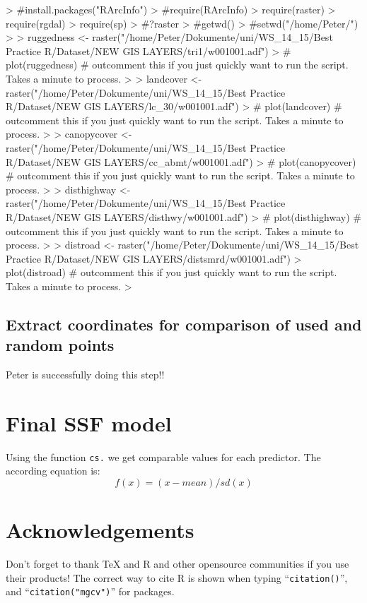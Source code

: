 \documentclass[11pt, a4paper]{article} %
\begin{document}
\begin{Schunk}
\begin{Sinput}
> #install.packages("RArcInfo")
> #require(RArcInfo)
> require(raster)
> require(rgdal)
> require(sp)
> #?raster
> #getwd()
> #setwd("/home/Peter/")
> 
> ruggedness <- raster("/home/Peter/Dokumente/uni/WS_14_15/Best Practice R/Dataset/NEW GIS LAYERS/tri1/w001001.adf") 
> # plot(ruggedness) # outcomment this if you just quickly want to run the script. Takes a minute to process.
> 
> landcover <- raster("/home/Peter/Dokumente/uni/WS_14_15/Best Practice R/Dataset/NEW GIS LAYERS/lc_30/w001001.adf") 
> # plot(landcover) # outcomment this if you just quickly want to run the script. Takes a minute to process.
> 
> canopycover <- raster("/home/Peter/Dokumente/uni/WS_14_15/Best Practice R/Dataset/NEW GIS LAYERS/cc_abmt/w001001.adf") 
> # plot(canopycover) # outcomment this if you just quickly want to run the script. Takes a minute to process.
> 
> disthighway <- raster("/home/Peter/Dokumente/uni/WS_14_15/Best Practice R/Dataset/NEW GIS LAYERS/disthwy/w001001.adf") 
> # plot(disthighway) # outcomment this if you just quickly want to run the script. Takes a minute to process.
> 
> distroad <- raster("/home/Peter/Dokumente/uni/WS_14_15/Best Practice R/Dataset/NEW GIS LAYERS/distsmrd/w001001.adf") 
> plot(distroad) # outcomment this if you just quickly want to run the script. Takes a minute to process.
> 
\end{Sinput}
\end{Schunk}


\subsection{Extract coordinates for comparison of used and random points} %
Peter is successfully doing this step!!

\section{Final SSF model}

Using the function \texttt{cs.} we get comparable values for each predictor. The according equation is: 
\[
\displaystyle f(x) = (x - mean)/sd(x)
\]

\section{Acknowledgements}
Don't forget to thank TeX and R and other opensource communities if you use their products! The correct way to cite R is shown when typing ``\texttt{citation()}'', and ``\texttt{citation("mgcv")}'' for packages.

{}

\end{document}

